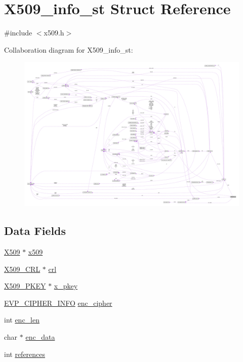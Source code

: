 \hypertarget{struct_x509__info__st}{}\section{X509\+\_\+info\+\_\+st Struct Reference}
\label{struct_x509__info__st}


{\ttfamily \#include $<$x509.\+h$>$}



Collaboration diagram for X509\+\_\+info\+\_\+st\+:\nopagebreak
\begin{figure}[H]
\begin{center}
\leavevmode
\includegraphics[width=350pt]{struct_x509__info__st__coll__graph}
\end{center}
\end{figure}
\subsection*{Data Fields}
\begin{DoxyCompactItemize}
\item 
\hyperlink{crypto_2ossl__typ_8h_a4f666bde6518f95deb3050c54b408416}{X509} $\ast$ \hyperlink{struct_x509__info__st_adf3937adedbf4fffe3a813a89b5b4c8d}{x509}
\item 
\hyperlink{crypto_2ossl__typ_8h_ac8661d2485c2c8da5fd7dd26b846f4bf}{X509\+\_\+\+C\+RL} $\ast$ \hyperlink{struct_x509__info__st_a097ce42aa48bbc5d44148e782c3d56ae}{crl}
\item 
\hyperlink{crypto_2x509_2x509_8h_a3c6aa7f1ac02d0eadbcd9415cc5ed0e0}{X509\+\_\+\+P\+K\+EY} $\ast$ \hyperlink{struct_x509__info__st_a27edb5dd0e5f313ed9c3cdcbf0ecf7c7}{x\+\_\+pkey}
\item 
\hyperlink{crypto_2evp_2evp_8h_a0ff32d74885621bf0ee4f962602e6c9b}{E\+V\+P\+\_\+\+C\+I\+P\+H\+E\+R\+\_\+\+I\+N\+FO} \hyperlink{struct_x509__info__st_a957583bb1c3c2a11ce8cb06200355a4e}{enc\+\_\+cipher}
\item 
int \hyperlink{struct_x509__info__st_a1b09320c90f77486e88b79923ba61f6b}{enc\+\_\+len}
\item 
char $\ast$ \hyperlink{struct_x509__info__st_a23d82bad660e30414bf67db94fe0eb2d}{enc\+\_\+data}
\item 
int \hyperlink{struct_x509__info__st_a146fdb34d9a909e530adf8b189481195}{references}
\end{DoxyCompactItemize}


